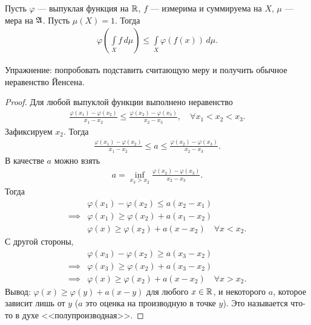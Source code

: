 \begin{thm}
 Пусть $\varphi$ --- выпуклая функция на  $\mathbb{R}$, $f$ --- измерима и суммируема на $X$, $\mu$ --- мера на $\mathfrak{A}$. Пусть  $\mu(X) = 1$. Тогда  \begin{align*}
  \varphi \left( \int\limits_{X} f \, d\mu   \right) \leqslant \int\limits_{X} \varphi(f(x)) \, d\mu  
 .\end{align*} 
\end{thm}
Упражнение: попробовать подставить считающую меру и получить обычное неравенство Йенсена.
\begin{proof}
 Для любой выпуклой функции выполнено неравенство \begin{align*}
   \frac{\varphi(x_1) - \varphi(x_2)}{x_1 - x_2} \leqslant \frac{\varphi(x_2) - \varphi(x_3)}{x_2 - x_3}, \quad \forall x_1 < x_2 < x_3
 .\end{align*} Зафиксируем $x_2$. Тогда \begin{align*}
  \frac{\varphi(x_1) - \varphi(x_2)}{x_1 - x_2} \leqslant a \leqslant \frac{\varphi(x_{2}) - \varphi(x_3)}{x_2 - x_3}
 .\end{align*} В качестве $a$ можно взять  \begin{align*}
 a = \inf_{x_3 > x_2} \frac{\varphi(x_2) - \varphi(x_3)}{x_2 - x_3}
 .\end{align*} Тогда \begin{align*}
 &\varphi(x_1) - \varphi(x_2) \leqslant a (x_2 - x_1) \\
  \implies &\varphi(x_1) \geqslant \varphi(x_2) + a(x_1 - x_2) \\
  &\varphi(x) \geqslant \varphi(x_2) + a(x - x_2) \quad \forall x < x_2
 .\end{align*} С другой стороны, \begin{align*}
 &\varphi(x_3) - \varphi(x_2) \geqslant a(x_3 - x_2) \\
 \implies &\varphi(x_3) \geqslant \varphi(x_2) + a(x_3 - x_2) \\
  \implies &\varphi(x) \geqslant \varphi(x_2) + a(x - x_2) \quad \forall x > x_2
 .\end{align*} Вывод: $\varphi(x) \geqslant \varphi(y) + a(x - y)$ для любого $x \in \mathbb{R}$, и некоторого $a$, которое зависит лишь от $y$ ($a$ это оценка на производную в точке $y$). Это называется что-то в духе <<полупроизводная>>.


\end{proof}
